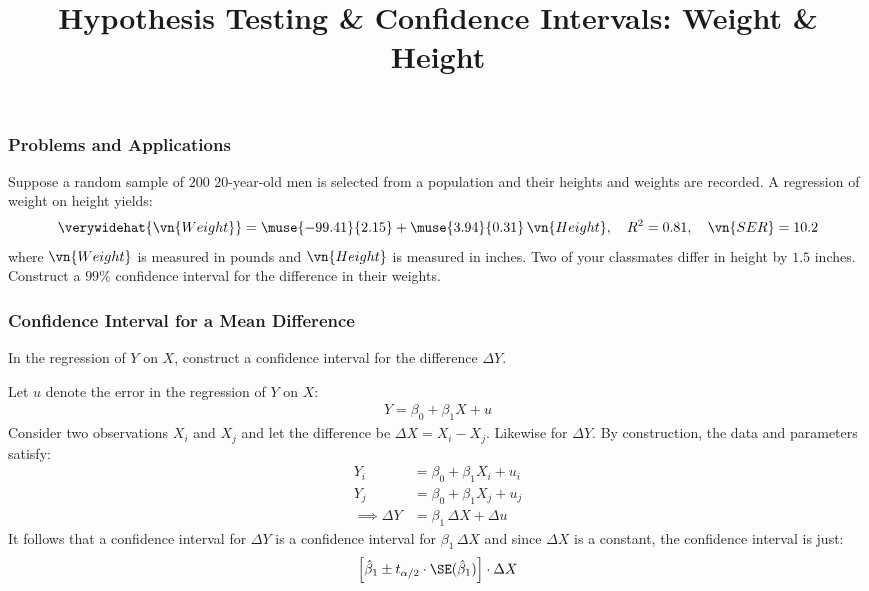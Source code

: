 \title[Weight]{Hypothesis Testing \& Confidence Intervals: Weight \& Height}
\date{}






\begin{frame}
\frametitle{Problems and Applications}
Suppose a random sample of $200$ $20$-year-old men is selected from a population and their heights and weights are recorded. A regression of weight on height yields:
\begin{align*}
\verywidehat{\vn{Weight}} 
  = \muse{-99.41}{2.15} + \muse{3.94}{0.31}\,\vn{Height},
  \quad R^2 = 0.81,
  \quad \vn{SER} = 10.2
\end{align*}
where $\vn{Weight}$ is measured in pounds and $\vn{Height}$ is measured in inches. Two of your classmates differ in height by $1.5$ inches. Construct a $99\%$ confidence interval for the difference in their weights.
\end{frame}


\begin{frame}
\frametitle{Confidence Interval for a Mean Difference}

In the regression of $Y$ on $X$, construct a confidence interval for the difference $\Delta Y$.

\begin{answer}
Let $u$ denote the error in the regression of $Y$ on $X$:
\begin{align*}
Y = \beta_{0} + \beta_{1} X + u
\end{align*}
Consider two observations $X_{i}$ and $X_{j}$ and let the difference be $\Delta X=X_{i}-X_{j}$. Likewise for $\Delta Y$. By construction, the data and parameters satisfy:
\begin{align*}
Y_{i} & = \beta_{0} + \beta_{1} X_{i} + u_{i}\\
Y_{j} & = \beta_{0} + \beta_{1} X_{j} + u_{j}\\
\implies 
\Delta Y & = \beta_{1}\,\Delta X + \Delta u
\end{align*}
It follows that a confidence interval for $\Delta Y$ is a confidence interval for $\beta_{1}\,\Delta X$ and since $\Delta X$ is a constant, the confidence interval is just:
\begin{align*}
\left[ \hat{\beta}_{1} \pm t_{\alpha/2} \cdot \SE(\hat{\beta}_{1}) \right] \cdot \Delta X 
\end{align*}
\end{answer}

\end{frame}


